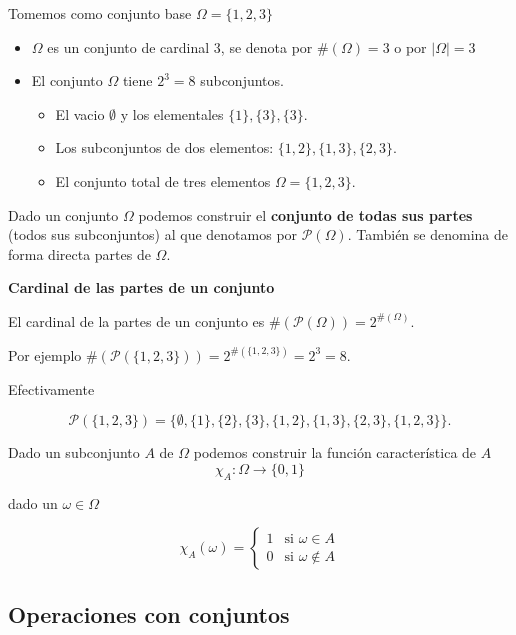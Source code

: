 \documentclass[]{book}
\providecommand{\tightlist}{%
  \setlength{\itemsep}{0pt}\setlength{\parskip}{0pt}}
\begin{document}
Tomemos como conjunto base \(\Omega=\{1,2,3\}\)

\begin{itemize}
\tightlist
\item
  \(\Omega\) es un conjunto de cardinal 3, se denota por \(\#(\Omega)=3\) o por \(|\Omega|=3\)
\item
  El conjunto \(\Omega\) tiene \(2^3=8\) subconjuntos.

  \begin{itemize}
  \tightlist
  \item
    El vacio \(\emptyset\) y los elementales \(\{1\},\{3\},\{3\}\).
  \item
    Los subconjuntos de dos elementos: \(\{1,2\},\{1,3\},\{2,3\}\).
  \item
    El conjunto total de tres elementos \(\Omega=\{1,2,3\}.\)
  \end{itemize}
\end{itemize}

Dado un conjunto \(\Omega\) podemos construir el \textbf{conjunto de todas sus partes} (todos sus subconjuntos) al que denotamos por \(\mathcal{P}(\Omega)\). También se denomina de forma directa partes de \(\Omega\).

\textbf{Cardinal de las partes de un conjunto}

El cardinal de la partes de un conjunto es \(\#(\mathcal{P}(\Omega))=2^{\#(\Omega)}.\)

Por ejemplo \(\#\left(\mathcal{P}(\{1,2,3\})\right)=2^{\#(\{1,2,3\})}=2^3=8.\)

Efectivamente

\[\mathcal{P}(\{1,2,3\})=\{\emptyset,\{1\},\{2\},\{3\},\{1,2\},\{1,3\},\{2,3\},\{1,2,3\}\}.\]

Dado un subconjunto \(A\) de \(\Omega\) podemos construir la función característica de \(A\)
\[\chi_A:\Omega \to \{0,1\}\]

dado un \(\omega\in \Omega\)

\[
\chi_A(\omega)=
\left\{
\begin{array}{ll}
1 &  \mbox{si }\omega \in A\\
0 &  \mbox{si }\omega \not\in A
\end{array}
\right.
\]

\hypertarget{operaciones-con-conjuntos}{%
\subsection{Operaciones con conjuntos}\label{operaciones-con-conjuntos}}
\end{document}
